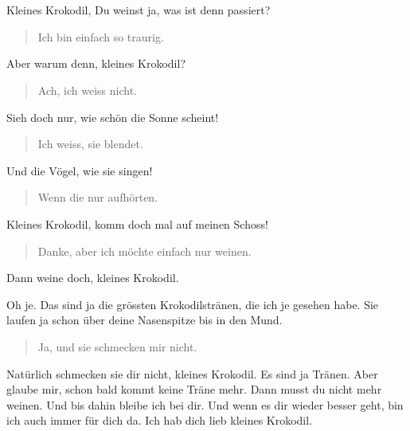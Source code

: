 \chapter*{}

Kleines Krokodil, Du weinst ja, was ist denn passiert?
\begin{quotation}
Ich bin einfach so traurig.
\end{quotation}
Aber warum denn, kleines Krokodil?

\begin{quotation}
Ach, ich weiss nicht.

\end{quotation}
Sieh doch nur, wie schön die Sonne scheint!

\begin{quotation}
Ich weiss, sie blendet.

\end{quotation}
Und die Vögel, wie sie singen!

\begin{quotation}
Wenn die nur aufhörten.

\end{quotation}
Kleines Krokodil, komm doch mal auf meinen Schoss!

\begin{quotation}
Danke, aber ich möchte einfach nur weinen.

\end{quotation}
Dann weine doch, kleines Krokodil.



Oh je. Das sind ja die grössten Krokodilstränen, die ich je gesehen habe. Sie laufen ja schon über deine Nasenspitze bis in den Mund.

\begin{quotation}
Ja, und sie schmecken mir nicht.
\end{quotation}
Natürlich schmecken sie dir nicht, kleines Krokodil. Es sind ja Tränen. Aber glaube mir, schon bald kommt keine Träne mehr. Dann musst du nicht mehr weinen. Und bis dahin bleibe ich bei dir. Und wenn es dir wieder besser geht, bin ich auch immer für dich da. Ich hab dich lieb kleines Krokodil.

